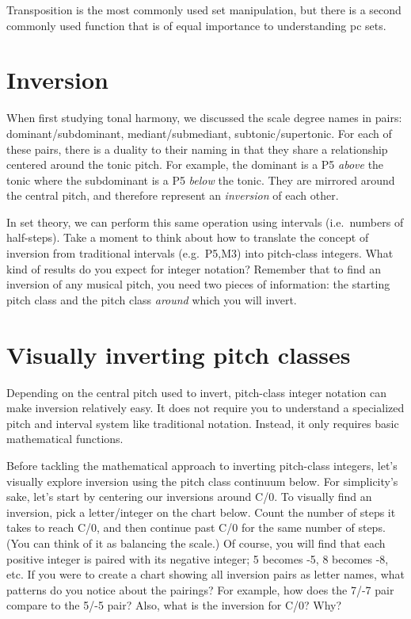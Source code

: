 \documentclass{book}
\begin{document}
Transposition is the most commonly used set manipulation, but there is a
second commonly used function that is of equal importance to understanding pc
sets.

\hypertarget{inversion}{%
\section{Inversion}\label{inversion}}

When first studying tonal harmony, we discussed the scale degree names in
pairs: dominant/subdominant, mediant/submediant, subtonic/supertonic. For each
of these pairs, there is a duality to their naming in that they share a
relationship centered around the tonic pitch. For example, the dominant is a
P5 \emph{above} the tonic where the subdominant is a P5 \emph{below} the
tonic. They are mirrored around the central pitch, and therefore represent an
\emph{inversion} of each other.

In set theory, we can perform this same operation using intervals
(i.e.~numbers of half-steps). Take a moment to think about how to translate
the concept of inversion from traditional intervals (e.g.~P5,M3) into
pitch-class integers. What kind of results do you expect for integer notation?
Remember that to find an inversion of any musical pitch, you need two pieces
of information: the starting pitch class and the pitch class \emph{around}
which you will invert.

\hypertarget{visually-inverting-pitch-classes}{%
\section{Visually inverting pitch
classes}\label{visually-inverting-pitch-classes}}

Depending on the central pitch used to invert, pitch-class integer notation
can make inversion relatively easy. It does not require you to understand a
specialized pitch and interval system like traditional notation. Instead, it
only requires basic mathematical functions.

Before tackling the mathematical approach to inverting pitch-class integers,
let's visually explore inversion using the pitch class continuum below. For
simplicity's sake, let's start by centering our inversions around C/0. To
visually find an inversion, pick a letter/integer on the chart below. Count
the number of steps it takes to reach C/0, and then continue past C/0 for the
same number of steps. (You can think of it as balancing the scale.) Of course,
you will find that each positive integer is paired with its negative integer;
5 becomes -5, 8 becomes -8, etc. If you were to create a chart showing all
inversion pairs as letter names, what patterns do you notice about the
pairings? For example, how does the 7/-7 pair compare to the 5/-5 pair? Also,
what is the inversion for C/0? Why?
\end{document}

